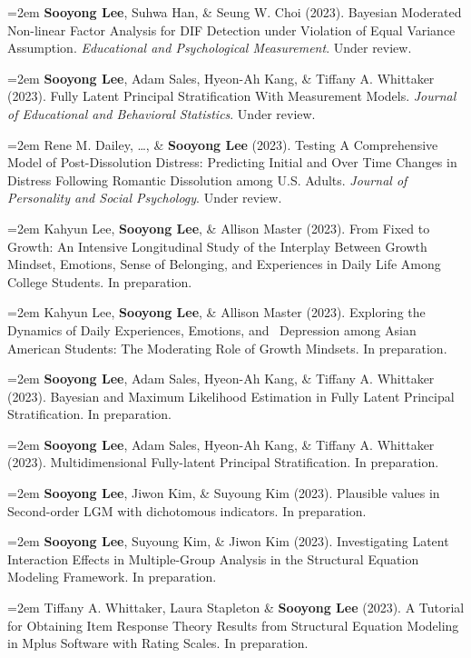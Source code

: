 \documentclass[11pt,letterpaper,]{awesome-me}
\begin{document}
\hangindent=2em  \textbf{Sooyong Lee}, Suhwa Han, \& Seung
W. Choi (2023). Bayesian Moderated Non-linear Factor Analysis for DIF
Detection under Violation of Equal Variance Assumption.
\emph{Educational and Psychological Measurement}. Under review.

\hangindent=2em  \textbf{Sooyong Lee}, Adam Sales, Hyeon-Ah
Kang, \& Tiffany A. Whittaker (2023). Fully Latent Principal
Stratification With Measurement Models. \emph{Journal of Educational and
Behavioral Statistics}. Under review.

\hangindent=2em  Rene M. Dailey, \ldots, \& \textbf{Sooyong
Lee} (2023). Testing A Comprehensive Model of Post-Dissolution Distress:
Predicting Initial and Over Time Changes in Distress Following Romantic
Dissolution among U.S. Adults. \emph{Journal of Personality and Social
Psychology}. Under review.

\hangindent=2em  Kahyun Lee, \textbf{Sooyong Lee}, \&
Allison Master (2023). From Fixed to Growth: An Intensive Longitudinal
Study of the Interplay Between Growth Mindset, Emotions, Sense of
Belonging, and Experiences in Daily Life Among College Students. In
preparation.

\hangindent=2em  Kahyun Lee, \textbf{Sooyong Lee}, \&
Allison Master (2023). Exploring the Dynamics of Daily Experiences,
Emotions, and ~Depression among Asian American Students: The Moderating
Role of Growth Mindsets. In preparation.

\hangindent=2em  \textbf{Sooyong Lee}, Adam Sales, Hyeon-Ah
Kang, \& Tiffany A. Whittaker (2023). Bayesian and Maximum Likelihood
Estimation in Fully Latent Principal Stratification. In preparation.

\hangindent=2em  \textbf{Sooyong Lee}, Adam Sales, Hyeon-Ah
Kang, \& Tiffany A. Whittaker (2023). Multidimensional Fully-latent
Principal Stratification. In preparation.

\hangindent=2em  \textbf{Sooyong Lee}, Jiwon Kim, \& Suyoung
Kim (2023). Plausible values in Second-order LGM with dichotomous
indicators. In preparation.

\hangindent=2em  \textbf{Sooyong Lee}, Suyoung Kim, \& Jiwon
Kim (2023). Investigating Latent Interaction Effects in Multiple-Group
Analysis in the Structural Equation Modeling Framework. In preparation.

\hangindent=2em  Tiffany A. Whittaker, Laura Stapleton \&
\textbf{Sooyong Lee} (2023). A Tutorial for Obtaining Item Response
Theory Results from Structural Equation Modeling in Mplus Software with
Rating Scales. In preparation.
\end{document}
